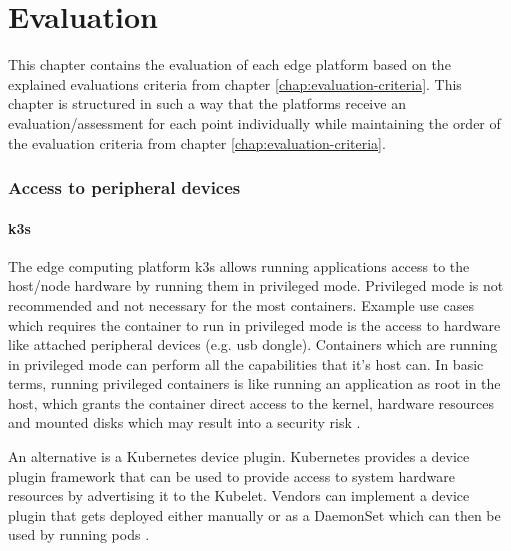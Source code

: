 \chapter{Evaluation}\label{chap:evaluation}
This chapter contains the evaluation of each edge platform based on the explained evaluations criteria from chapter \ref{chap:evaluation-criteria}. This chapter is structured in such a way that the platforms receive an evaluation/assessment for each point individually while maintaining the order of the evaluation criteria from chapter \ref{chap:evaluation-criteria}.

\subsection*{Access to peripheral devices}
\subsubsection*{k3s}\label{subsubsec:evaluation-peripheral-devices-k3s}
The edge computing platform k3s allows running applications access to the host/node hardware by running them in privileged mode. Privileged mode is not recommended and not necessary for the most containers. Example use cases which requires the container to run in privileged mode is the access to hardware like attached peripheral devices (e.g. \gls{usb} dongle). Containers which are running in privileged mode can perform all the capabilities that it's host can. In basic terms, running privileged containers is like running an application as root in the host, which grants the container direct access to the kernel, hardware resources and mounted disks which may result into a security risk \cite{DockerRunReference} \cite{Cardoso2020}. 

\bigskip
An alternative is a Kubernetes device plugin. Kubernetes provides a device plugin framework that can be used to provide access to system hardware resources by advertising it to the Kubelet. Vendors can implement a device plugin that gets deployed either manually or as a DaemonSet which can then be used by running pods \cite{KubernetesDevicePlugins}.

